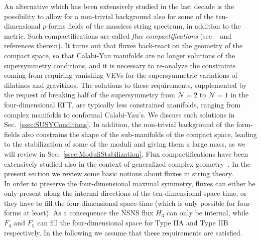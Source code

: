 \documentclass[12pt,a4paper]{book}
\begin{document}
An alternative which has been extensively studied in the last decade is the possibility to allow for a non-trivial background also for some of the ten-dimensional $p$-forms fields of the massless string spectrum, in addition to the metric. Such compactifications are called \textit{flux compactifications} (see ~\cite{Grana:2005jc, Douglas:2006es, Blumenhagen:2006ci} and references therein). It turns out that fluxes back-react on the geometry of the compact space, so that Calabi-Yau manifolds are no longer solutions of the supersymmetry conditions, and it is necessary to re-analyze the constraints coming from requiring vanishing VEVs for the supersymmetric variations of dilatinos and gravitinos. The solutions to these requirements, supplemented by the request of breaking half of the supersymmetry from $\mathcal{N} = 2$ to $\mathcal{N} = 1$ in the four-dimensional EFT, are typically less constrained manifolds, ranging from complex manifolds to conformal Calabi-Yau's. We discuss such solutions in Sec.~\ref{ssec:SUSYConditions}. In addition, the non-trivial background of the form-fields also constrains the shape of the sub-manifolds of the compact space, leading to the stabilization of some of the moduli and giving them a large mass, as we will review in Sec.~\ref{ssec:ModuliStabilization}. Flux compactifications have been extensively studied also in the context of generalized complex geometry~\cite{Hitchin:2004ut, Gualtieri:2007ng, Grana:2004bg, Grana:2005sn, Martucci:2005ht, Martucci:2006ij, Koerber:2007xk, Martucci:2009sf}. In the present section we review some basic notions about fluxes in string theory.\\

In order to preserve the four-dimensional maximal symmetry, fluxes can either be only present along the internal directions of the ten-dimensional space-time, or they have to fill the four-dimensional space-time (which is only possible for four-forms at least). As a consequence the NSNS flux $H_3$ can only be internal, while $F_4$ and $F_5$ can fill the four-dimensional space for Type IIA and Type IIB respectively. In the following we assume that these requirements are satisfied.\\
\end{document}
